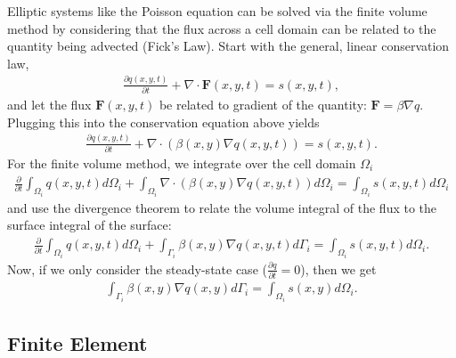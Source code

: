 Elliptic systems like the Poisson equation can be solved via the finite volume method by considering that the flux across a cell domain can be related to the quantity being advected (Fick's Law). Start with the general, linear conservation law,
\begin{align}
    \frac{\partial q(x,y,t)}{\partial t} + \nabla \cdot \textbf{F}(x,y,t) = s(x,y,t),
\end{align}
and let the flux $\textbf{F}(x,y,t)$ be related to gradient of the quantity: $\textbf{F} = \beta \nabla q$. Plugging this into the conservation equation above yields
\begin{align}
    \frac{\partial q(x,y,t)}{\partial t} + \nabla \cdot \left( \beta(x,y) \nabla q(x,y,t) \right) = s(x,y,t).
\end{align}
For the finite volume method, we integrate over the cell domain $\Omega_i$
\begin{align}
    \frac{\partial}{\partial t} \int_{\Omega_i} q(x,y,t) d\Omega_i + \int_{\Omega_i} \nabla \cdot \left( \beta(x,y) \nabla q(x,y,t) \right) d\Omega_i = \int_{\Omega_i} s(x,y,t) d\Omega_i
\end{align}
and use the divergence theorem to relate the volume integral of the flux to the surface integral of the surface:
\begin{align}
    \frac{\partial}{\partial t} \int_{\Omega_i} q(x,y,t) d\Omega_i + \int_{\Gamma_i} \beta(x,y) \nabla q(x,y,t) d\Gamma_i = \int_{\Omega_i} s(x,y,t) d\Omega_i.
\end{align}
Now, if we only consider the steady-state case ($\frac{\partial q}{\partial t} = 0$), then we get
\begin{align}
    \int_{\Gamma_i} \beta(x,y) \nabla q(x,y) d\Gamma_i = \int_{\Omega_i} s(x,y) d\Omega_i.
\end{align}


\subsection{Finite Element}

